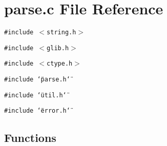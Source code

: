 \section{parse.c File Reference}
\label{parse_8c}
{\tt \#include $<$string.h$>$}\par
{\tt \#include $<$glib.h$>$}\par
{\tt \#include $<$ctype.h$>$}\par
{\tt \#include \char`\"{}parse.h\char`\"{}}\par
{\tt \#include \char`\"{}util.h\char`\"{}}\par
{\tt \#include \char`\"{}error.h\char`\"{}}\par
\subsection*{Functions}
